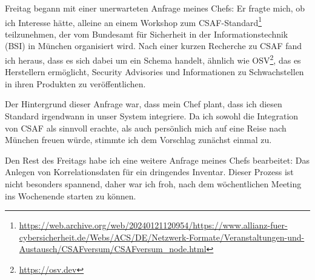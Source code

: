 
Freitag begann mit einer unerwarteten Anfrage meines Chefs:
Er fragte mich, ob ich Interesse hätte, alleine an einem Workshop zum CSAF-Standard\footnote{\url{https://web.archive.org/web/20240121120954/https://www.allianz-fuer-cybersicherheit.de/Webs/ACS/DE/Netzwerk-Formate/Veranstaltungen-und-Austausch/CSAFversum/CSAFversum_node.html}} teilzunehmen, der vom Bundesamt für Sicherheit in der Informationstechnik (BSI) in München organisiert wird.
Nach einer kurzen Recherche zu CSAF fand ich heraus, dass es sich dabei um ein Schema handelt, ähnlich wie OSV\footnote{\url{https://osv.dev}}, das es Herstellern ermöglicht, Security Advisories und Informationen zu Schwachstellen in ihren Produkten zu veröffentlichen.

Der Hintergrund dieser Anfrage war, dass mein Chef plant, dass ich diesen Standard irgendwann in unser System integriere.
Da ich sowohl die Integration von CSAF als sinnvoll erachte, als auch persönlich mich auf eine Reise nach München freuen würde, stimmte ich dem Vorschlag zunächst einmal zu.

Den Rest des Freitags habe ich eine weitere Anfrage meines Chefs bearbeitet:
Das Anlegen von Korrelationsdaten für ein dringendes Inventar.
Dieser Prozess ist nicht besonders spannend, daher war ich froh, nach dem wöchentlichen Meeting ins Wochenende starten zu können.
